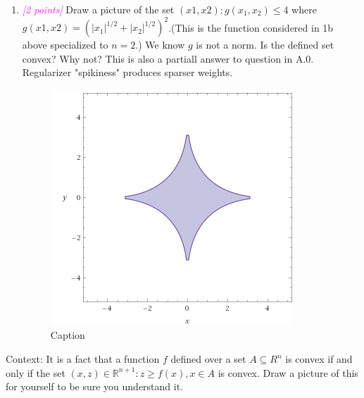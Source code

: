\documentclass{article}
\newcommand{\field}[1]{\mathbb{#1}}
\newcommand{\1}{\mathbf{1}}
\newcommand{\R}{\field{R}} %
\newcommand{\points}[1]{\small\textcolor{magenta}{\emph{[#1 points]}} \normalsize}
\begin{document}
\begin{enumerate}
    
    \item \points{2} Draw a picture of the set ${(x1,x2) : g(x_1,x_2)\leq 4}$ where $g(x1,x2) =(|x_1|^{1/2} + |x_2|^{1/2})^2$.(This is the function considered in 1b above specialized to $n=2$.)  We know $g$ is not a norm. Is the defined set convex? Why not?
    This is also a partiall answer to question in A.0. Regularizer "spikiness" produces sparser weights. 
    \begin{figure}
        \centering
        \includegraphics{HW2/HW2_plots/convexSetPlot.png}
        \caption{Caption}
        \label{fig:my_label}
    \end{figure}{}
    
\end{enumerate} 

Context:  It is a fact that a function $f$ defined over a set $A\subseteq R^n$ is convex if and only if the set ${(x,z)\in\R^{n+1}:z\geq f(x), x\in A}$ is convex.  Draw a picture of this for yourself to be sure you understand it.
\end{document}
